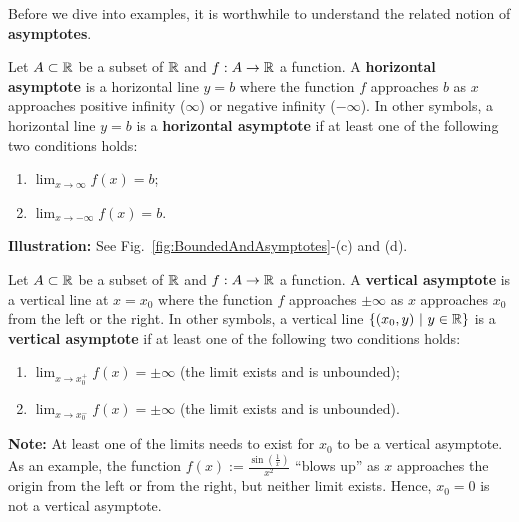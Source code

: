 \bigskip
Before we dive into examples, it is worthwhile to understand the related notion of \textbf{asymptotes}.
\bigskip


\begin{tcolorbox}[colback=mylightblue, title = {\bf Asymptotes come in two Flavors: Horizontal and Vertical}, breakable]
\begin{definition}
\label{def:AsymptotesHorizontal}
Let $A\subset \mathbb R $ be a subset of $\mathbb R$ and $f:A \to \mathbb R$ a function. A \textbf{horizontal asymptote} is a horizontal line $y = b$ where the function $f$ approaches $b$ as $x$ approaches positive infinity ($\infty$) or negative infinity ($-\infty$). In other symbols, a horizontal line $y = b$ is a \textbf{horizontal asymptote} if at least one of the following two conditions holds:
\begin{enumerate}
    \item $\displaystyle \lim_{{x \to \infty}} f(x) = b$;
    \item $\displaystyle \lim_{{x \to -\infty}} f(x) = b$.
\end{enumerate}

\end{definition}

\bigskip
\textbf{Illustration:} See Fig.~\ref{fig:BoundedAndAsymptotes}-(c) and (d).

\bigskip

\begin{definition}
\label{def:AsymptotesVertical}
Let $A\subset \mathbb R $ be a subset of $\mathbb R$ and $f:A \to \mathbb R$ a function. A \textbf{vertical asymptote} is a vertical line at $x = x_0$ where the function $f$ approaches $\pm \infty$ as $x$ approaches $x_0$ from the left or the right. In other symbols, a vertical line $\{(x_0, y)~|~ y \in \mathbb R \}$ is a \textbf{vertical asymptote} if at least one of the following two conditions holds:
\begin{enumerate}
    \item $\displaystyle \lim_{{x \to x_0^+}} f(x) = \pm \infty$ (the limit exists and is unbounded);
    \item $\displaystyle \lim_{{x \to x_0^-}} f(x) = \pm \infty$  (the limit exists and is unbounded).
\end{enumerate}

 \textbf{Note:} At least one of the limits needs to exist for $x_0$ to be a vertical asymptote. As an example, the function $\displaystyle f(x):=\frac{ \sin( \frac{1}{x} ) }{x^2}$ ``blows up'' as $x$ approaches the origin from the left or from the right, but neither limit exists. Hence, $x_0=0$ is not a vertical asymptote.


\end{definition}
\end{tcolorbox}
